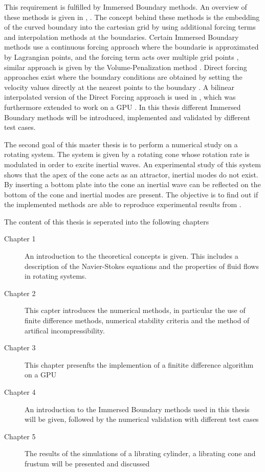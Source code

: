 This requirement is fulfilled by Immersed Boundary methods.
An overview of these methods is given in \citep{Mittal2005}, \citep{Gornak2013}.
The concept behind these methods is the embedding of the curved boundary into the cartesian grid
by using additional forcing terms and interpolation methods at the boundaries.
Certain Immersed Boundary methods use a continuous forcing approach where the boundarie is approximated by Lagrangian points,
and the forcing term acts over multiple grid points \citep{Mittal2005},
similar approach is given by the Volume-Penalization method \citep{Lulff2011}.
Direct forcing approaches exist where the boundary conditions are obtained by setting the
velocity values directly at the nearest points to the boundary \citep{Fadlun2000}.
A bilinear interpolated version of the Direct Forcing approach is used in \citep{Gornak2013},
which was furthermore extended to work on a GPU \citep{DeLeon2012}.
In this thesis different Immersed Boundary methods will be introduced, implemented and
validated by different test cases.

\bigbreak

The second goal of this master thesis is to perform a numerical study on a rotating system.
The system is given by a rotating cone whose rotation rate is modulated in order to excite inertial waves.
An experimental study of this system shows that the apex of the cone acts as an attractor, inertial modes do not exist.
By inserting a bottom plate into the cone an inertial wave can be reflected on the bottom of the cone \citep{Beardsley1970} and
inertial modes are present.
The objective is to find out if the implemented methods are able to reproduce experimental results from .


\bigbreak

The content of this thesis is seperated into the following chapters
\begin{description}
\item[Chapter 1] An introduction to the theoretical concepts is given.  This includes a description of the Navier-Stokes equations
                    and the properties of fluid flows in rotating systems.
\item[Chapter 2] This capter introduces the numerical methods, in particular the use of finite difference methods,
                    numerical stability criteria and the method of artifical incompressibility.
\item[Chapter 3] This chapter presenfts the implemention of a finitite difference  algorithm on a GPU

\item[Chapter 4] An introduction to  the Immersed Boundary methods used in this thesis will be given, followed by
                 the numerical validation with different test cases

\item[Chapter 5] The results of the simulations of a librating cylinder, a librating cone and frustum will be presented and discussed
\end{description}

